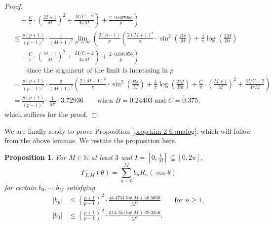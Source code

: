 \documentclass[11pt,letterpaper,reqno]{amsart}
\newtheorem{proposition}[theorem]{Proposition}
\theoremstyle{definition}
\numberwithin{equation}{section}
\numberwithin{figure}{section}
\numberwithin{table}{section}
\begin{document}
\begin{proof}
\begin{align}
    & \quad + \left. \left. \frac{C}{\pi} \cdot \left( \frac{M + 1}{M} \right)^2 + \frac{M/C - 2}{4 \pi M}  \right) + \frac{2 \cdot 0.607056}{p} \right)\\
    &\leq \frac{p(p + 1)}{(p - 1)^2} \cdot \frac{1}{(M + 1)^2} \lim_{p \rightarrow \infty} \left( \frac{2(p - 1)}{p} \left(\frac{2(M + 1)^2}{\pi} \cdot \sin^2\left(\frac{B\pi}{M} \right) + \frac{4}{\pi} \log \left( \frac{2M}{B\pi} \right)  \right. \right. \\
    & \quad + \left. \left. \frac{C}{\pi} \cdot \left( \frac{M + 1}{M} \right)^2 + \frac{M/C - 2}{4 \pi M}  \right) + \frac{2 \cdot 0.607056}{p} \right)\\
    & \qquad \text{since the argument of the limit is increasing in $p$}\\
    &= \frac{p(p + 1)}{(p - 1)^2} \cdot \frac{2}{(M + 1)^2}  \left(\frac{2(M + 1)^2}{\pi} \cdot \sin^2\left(\frac{B\pi}{M} \right) + \frac{4}{\pi} \log \left( \frac{2M}{B\pi} \right)  + \frac{C}{\pi} \cdot \left( \frac{M + 1}{M} \right)^2 + \frac{M/C - 2}{4 \pi M}  \right)\\
    &= \frac{p(p + 1)}{(p - 1)^2} \cdot \frac{1}{M^2}   \cdot 3.72936 \qquad \text{when $B = 0.24403$ and $C = 0.375$},
\end{align}
which suffices for the proof.
\end{proof}

We are finally ready to prove Proposition \ref{prop:kim-2-6-analog}, which will follow from the above lemmas. We restate the proposition here.

{
\renewcommand{\thetheorem}
{\ref{prop:kim-2-6-analog}}
\begin{proposition}
    For $M \in \mathbb{N}$ at least $3$ and $I = \left[0, \frac{1}{M} \right] \subseteq \left[0, 2\pi \right],$
    $$F_{I, M}^+(\theta) = \sum_{n = 0}^M b_n R_{n}(\cos \theta)$$
    for certain $b_0, \cdots, b_M$ satisfying
    \begin{align}
        |b_n| &\leq \left( \frac{p + 1}{p - 1} \right)^2 \cdot \frac{44.4751 \log M + 46.5666}{M^2} \qquad \text{for $n \geq 1$}, \\
        |b_0| &\leq \left( \frac{p + 1}{p - 1} \right)^2 \cdot \frac{314.255 \log M + 28.0356}{M^3}.
    \end{align}
\end{proposition}
\addtocounter{theorem}{-1}
}
\end{document}
